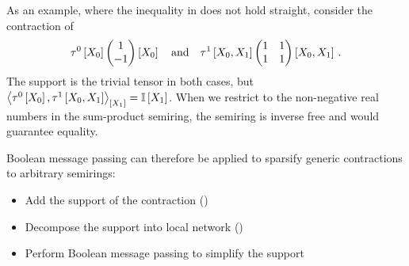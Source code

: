 As an example, where the inequality in  does not hold straight, consider the contraction of
\begin{align*}
    \tau^{0}\left[X_{0}\right]
    \begin{pmatrix} 
        1 \\ -1
     \end{pmatrix}\left[X_{0}\right]
    \quad \text{and} \quad
    \tau^{1}\left[X_{0},X_{1}\right]
    \begin{pmatrix} 
        1 & 1 \\ 1 & 1
     \end{pmatrix}\left[X_{0},X_{1}\right] \, .
\end{align*}
The support is the trivial tensor in both cases, but $\left\langle \tau^{0}\left[X_{0}\right],\tau^{1}\left[X_{0},X_{1}\right]\right\rangle_{\left[ X_{1} \right]}=\mathbb{I}\left[X_{1}\right]$.
When we restrict to the non-negative real numbers in the sum-product semiring, the semiring is inverse free and  would guarantee equality.

Boolean message passing can therefore be applied to sparsify generic contractions to arbitrary semirings:
\begin{itemize}
    \item Add the support of the contraction ()
    \item Decompose the support into local network ()
    \item Perform Boolean message passing to simplify the support
\end{itemize}
